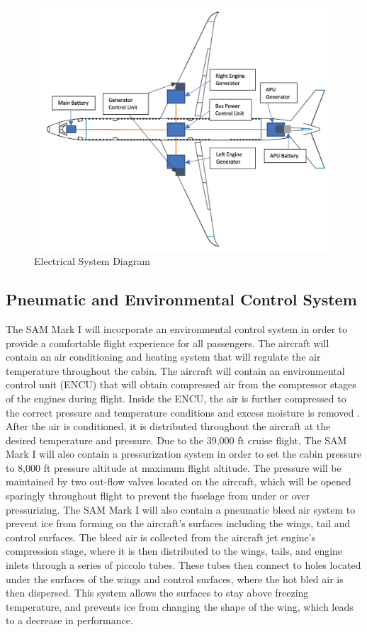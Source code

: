\begin{figure}[H]
    \centering
    \includegraphics[width=.75\linewidth]{Photos/systems/electrical_system.png}
    \caption{Electrical System Diagram}
    \label{electrical_system}
\end{figure}


\subsection{Pneumatic and Environmental Control System}
The SAM Mark I will incorporate an environmental control system in order to provide a comfortable flight experience for all passengers. The aircraft will contain an air conditioning and heating system that will regulate the air temperature throughout the cabin. The aircraft will contain an environmental control unit (ENCU) that will obtain compressed air from the compressor stages of the engines during flight. Inside the ENCU, the air is further compressed to the correct pressure and temperature conditions and excess moisture is removed \cite{env_system}. After the air is conditioned, it is distributed throughout the aircraft at the desired temperature and pressure. Due to the 39,000 ft cruise flight, The SAM Mark I will also contain a pressurization system in order to set the cabin pressure to 8,000 ft pressure altitude at maximum flight altitude. The pressure will be maintained by two out-flow valves located on the aircraft, which will be opened sparingly throughout flight to prevent the fuselage from under or over pressurizing. The SAM Mark I will also contain a pneumatic bleed air system to prevent ice from forming on the aircraft’s surfaces including the wings, tail and control surfaces. The bleed air is collected from the aircraft jet engine’s compression stage, where it is then distributed to the wings, tails, and engine inlets through a series of piccolo tubes. These tubes then connect to holes located under the surfaces of the wings and control surfaces, where the hot bled air is then dispersed. This system allows the surfaces to stay above freezing temperature, and prevents ice from changing the shape of the wing, which leads to a decrease in performance.

